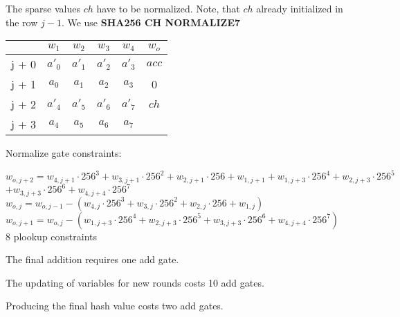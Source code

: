 The sparse values $ch$ have to be normalized.
Note, that $ch$ already initialized in the row $j - 1$.
We use \textbf{SHA256 CH NORMALIZE7}
\begin{center}
    \begin{tabular}{ c|c|c|c|c|c }
        & $w_1$  & $w_2$  & $w_3$  & $w_4$  & $w_o$ \\
        \hline
        j + 0 & $a'_0$ & $a'_1$ & $a'_2$ & $a'_3$ & $acc$ \\
        j + 1 & $a_0$  & $ a_1$ & $a_2$  & $a_3$  & 0     \\
        j + 2 & $a'_4$ & $a'_5$ & $a'_6$ & $a'_7$ & $ch$  \\
        j + 3 & $a_4$  & $ a_5$ & $a_6$  & $a_7$  &       \\
    \end{tabular}
\end{center}

Normalize gate constraints:
\begin{center}
    $w_{o,j+2} = w_{4,j+1} \cdot 256^3 + w_{3,j+1} \cdot 256^2 + w_{2,j+1} \cdot 256 + w_{1,j+1}
    + w_{1,j+3} \cdot 256^4 + w_{2,j+3} \cdot 256^5$ \\
    $+ w_{3,j+3} \cdot 256^6 + w_{4,j+4} \cdot 256^7$ \\
    $w_{o,j} = w_{o, j - 1} - (w_{4,j} \cdot 256^3 + w_{3,j} \cdot 256^2 + w_{2,j} \cdot 256 + w_{1,j})$ \\
    $w_{o,j+1} = w_{o,j} - ( w_{1,j+3} \cdot 256^4 + w_{2,j+3} \cdot 256^5+ w_{3,j+3} \cdot 256^6 + w_{4,j+4} \cdot 256^7)$ \\
    8 plookup constraints \\
\end{center}

The final addition requires one add gate.

The updating of variables for new rounds costs 10 add gates.

Producing the final hash value costs two add gates.
